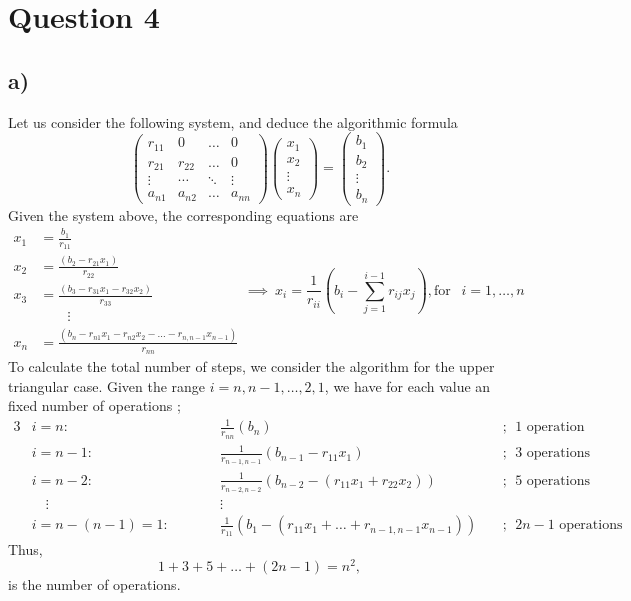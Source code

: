 \documentclass[12pt]{article}
\theoremstyle{definition}
\theoremstyle{definition}
\theoremstyle{definition}
\theoremstyle{definition}
\theoremstyle{definition}
\theoremstyle{example}
\theoremstyle{note}
\theoremstyle{remark}
\theoremstyle{example}
\begin{document}
		\section*{Question 4}
			\subsection*{a) }
				Let us consider the following system, and deduce the algorithmic formula 
				$$ \begin{pmatrix}
					r_{11} & 0 & \dots & 0 \\
					r_{21} & r_{22} & \dots & 0 \\
					\vdots & \cdots & \ddots & \vdots \\
					a_{n1} & a_{n2} & \dots & a_{nn} 
				\end{pmatrix}
				\begin{pmatrix}
					x_{1} \\ x_{2} \\ \vdots \\x_{n} 
				\end{pmatrix}
				= 
				\begin{pmatrix}
				b_{1} \\ b_{2} \\ \vdots \\ b_{n}
				\end{pmatrix}.$$
				Given the system above, the corresponding equations are  
				\begin{equation*}
					\begin{aligned}
						 x_{1} &= \frac{b_{1}}{r_{11}} \\
						 x_{2} &= \frac{(b_{2} - r_{21} x_{1})}{r_{22}} \\
						 x_{3} &= \frac{(b_{3} - r_{31} x_{1} -r_{32} x_{2})}{r_{33}}\\
						 & \qquad \vdots \\
						 x_{n} &= \frac{(b_{n} -r_{n1}x_{1} - r_{n2} x_{2} - \dots - r_{n,n-1} x_{n-1})}{r_{nn}}
					\end{aligned}
					 \! \implies \
					 \boxed{x_{i} = \frac{1}{r_{ii}}\left(b_{i} - \sum_{j=1}^{i-1} r_{ij}x_{j}\right),\! \text{for } \ \ i = 1 , \dots , n}
				\end{equation*}
					To calculate the total number of steps, we consider the algorithm for the upper triangular case. Given the range $i = n , n-1 , \dots, 2, 1$, we have for each value an fixed number of operations ; 
				\begin{alignat*}{3}
					&i = n : \qquad &&\frac{1}{r_{nn}} (b_{n}) \  &&; \ \ 1 \text{ operation} \\ 
					&i = n-1 : \qquad &&\frac{1}{r_{n-1,n-1}} (b_{n-1} - r_{11}x_{1} ) \ &&; \ \   3 \text{ operations } \\
					&i = n-2 : \qquad && \frac{1}{r_{n-2,n-2}} (b_{n-2} -(r_{11}x_{1} + r_{22}x_{2})) \ &&; \ \ 5 \text{ operations} \\
					 & \quad \vdots&& \vdots&& \\
					&i = n-(n-1) =1 : \qquad && \frac{1}{r_{11}}(b_{1} - (r_{11}x_{1} + \dots + r_{n-1,n-1}x_{n-1})) \ &&; \ \  2n-1 \text{ operations} 
				\end{alignat*}
				Thus, 
				$$1+3+5+\dots + (2n-1)  = n^{2},$$
				is the number of operations. 
\end{document}
